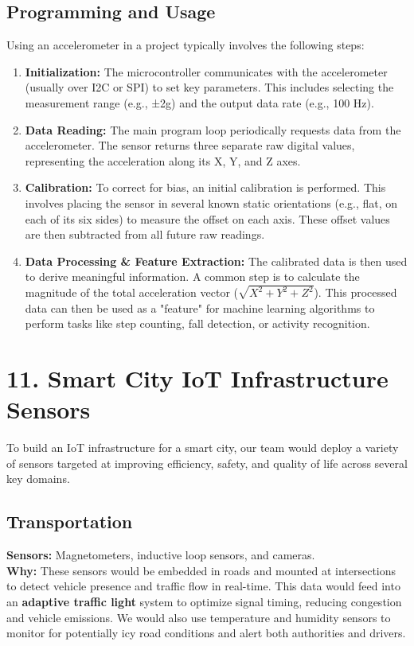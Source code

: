 \documentclass[a4paper,12pt]{article}
\begin{document}
\subsection*{Programming and Usage}
Using an accelerometer in a project typically involves the following steps:
\begin{enumerate}
    \item \textbf{Initialization:} The microcontroller communicates with the accelerometer (usually over I2C or SPI) to set key parameters. This includes selecting the measurement range (e.g., ±2g) and the output data rate (e.g., 100 Hz).
    \item \textbf{Data Reading:} The main program loop periodically requests data from the accelerometer. The sensor returns three separate raw digital values, representing the acceleration along its X, Y, and Z axes.
    \item \textbf{Calibration:} To correct for bias, an initial calibration is performed. This involves placing the sensor in several known static orientations (e.g., flat, on each of its six sides) to measure the offset on each axis. These offset values are then subtracted from all future raw readings.
    \item \textbf{Data Processing \& Feature Extraction:} The calibrated data is then used to derive meaningful information. A common step is to calculate the magnitude of the total acceleration vector ($\sqrt{X^2 + Y^2 + Z^2}$). This processed data can then be used as a "feature" for machine learning algorithms to perform tasks like step counting, fall detection, or activity recognition. 
\end{enumerate}

\section*{11. Smart City IoT Infrastructure Sensors}

To build an IoT infrastructure for a smart city, our team would deploy a variety of sensors targeted at improving efficiency, safety, and quality of life across several key domains. 

\subsection*{Transportation}
\textbf{Sensors:} Magnetometers, inductive loop sensors, and cameras. \\
\textbf{Why:} These sensors would be embedded in roads and mounted at intersections to detect vehicle presence and traffic flow in real-time. This data would feed into an \textbf{adaptive traffic light} system to optimize signal timing, reducing congestion and vehicle emissions. We would also use temperature and humidity sensors to monitor for potentially icy road conditions and alert both authorities and drivers. 
\end{document}
